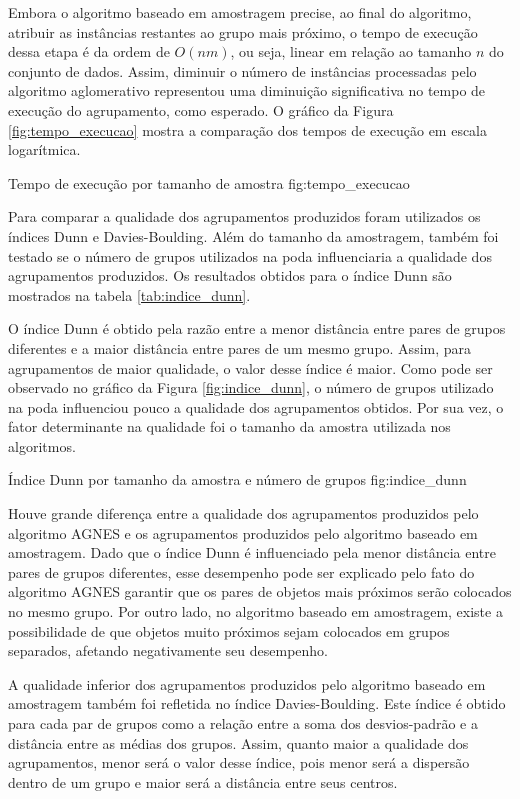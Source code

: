 

Embora o algoritmo baseado em amostragem precise, ao final do algoritmo,
atribuir as instâncias restantes ao grupo mais próximo, o tempo de execução 
dessa etapa é da ordem de $O\left(nm\right)$, ou seja, linear em relação ao 
tamanho $n$ do conjunto de dados. Assim, diminuir o número de instâncias
processadas pelo algoritmo aglomerativo representou uma diminuição significativa
no tempo de execução do agrupamento, como esperado. O gráfico da Figura 
\ref{fig:tempo_execucao} mostra a comparação dos tempos de execução em escala
logarítmica.

{Tempo de execução por tamanho de amostra}
{fig:tempo_execucao}

Para comparar a qualidade dos agrupamentos produzidos foram utilizados os
índices Dunn e Davies-Boulding. Além do tamanho da amostragem, também foi
testado se o número de grupos utilizados na poda influenciaria a qualidade dos
agrupamentos produzidos. Os resultados obtidos para o índice Dunn são mostrados
na tabela \ref{tab:indice_dunn}.



O índice Dunn é obtido pela razão entre a menor distância entre pares de grupos
diferentes e a maior distância entre pares de um mesmo grupo. Assim, para
agrupamentos de maior qualidade, o valor desse índice é maior. Como pode ser 
observado no gráfico da Figura \ref{fig:indice_dunn}, o número de grupos
utilizado na poda influenciou pouco a qualidade dos agrupamentos obtidos. Por
sua vez, o fator determinante na qualidade foi o tamanho da amostra utilizada
nos algoritmos.

{Índice Dunn por tamanho da amostra e número de grupos}
{fig:indice_dunn}

Houve grande diferença entre a qualidade dos agrupamentos produzidos pelo
algoritmo AGNES e os agrupamentos produzidos pelo algoritmo baseado em
amostragem. Dado que o índice Dunn é influenciado pela menor distância entre
pares de grupos diferentes, esse desempenho pode ser explicado pelo fato do 
algoritmo AGNES garantir que os pares de objetos mais próximos serão colocados 
no mesmo grupo. Por outro lado, no algoritmo baseado em amostragem, existe a
possibilidade de que objetos muito próximos sejam colocados em grupos separados,
afetando negativamente seu desempenho.

A qualidade inferior dos agrupamentos produzidos pelo algoritmo baseado em 
amostragem também foi refletida no índice Davies-Boulding. Este índice é obtido
para cada par de grupos como a relação entre a soma dos desvios-padrão e a 
distância entre as médias dos grupos. Assim, quanto maior a qualidade dos 
agrupamentos, menor será o valor desse índice, pois menor será a dispersão
dentro de um grupo e maior será a distância entre seus centros. 

